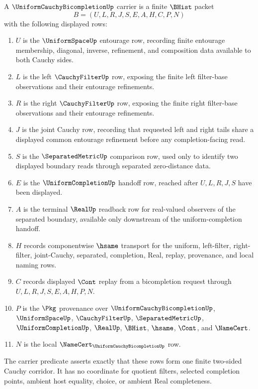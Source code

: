 \begin{definition}
\label{def:uniform-cauchy-bicompletion-carrier}
A $\UniformCauchyBicompletionUp$ carrier is a finite $\BHist$ packet
$$
B=(U,L,R,J,S,E,A,H,C,P,N)
$$
with the following displayed rows:
\begin{enumerate}
\item $U$ is the $\UniformSpaceUp$ entourage row, recording finite entourage membership, diagonal, inverse, refinement, and composition data available to both Cauchy sides.
\item $L$ is the left $\CauchyFilterUp$ row, exposing the finite left filter-base observations and their entourage refinements.
\item $R$ is the right $\CauchyFilterUp$ row, exposing the finite right filter-base observations and their entourage refinements.
\item $J$ is the joint Cauchy row, recording that requested left and right tails share a displayed common entourage refinement before any completion-facing read.
\item $S$ is the $\SeparatedMetricUp$ comparison row, used only to identify two displayed boundary reads through separated zero-distance data.
\item $E$ is the $\UniformCompletionUp$ handoff row, reached after $U,L,R,J,S$ have been displayed.
\item $A$ is the terminal $\RealUp$ readback row for real-valued observers of the separated boundary, available only downstream of the uniform-completion handoff.
\item $H$ records componentwise $\hsame$ transport for the uniform, left-filter, right-filter, joint-Cauchy, separated, completion, Real, replay, provenance, and local naming rows.
\item $C$ records displayed $\Cont$ replay from a bicompletion request through $U,L,R,J,S,E,A,H,P,N$.
\item $P$ is the $\Pkg$ provenance over $\UniformCauchyBicompletionUp$, $\UniformSpaceUp$, $\CauchyFilterUp$, $\SeparatedMetricUp$, $\UniformCompletionUp$, $\RealUp$, $\BHist$, $\hsame$, $\Cont$, and $\NameCert$.
\item $N$ is the local $\NameCert_{\UniformCauchyBicompletionUp}$ row.
\end{enumerate}
The carrier predicate asserts exactly that these rows form one finite two-sided Cauchy corridor. It has no coordinate for quotient filters, selected completion points, ambient host equality, choice, or ambient Real completeness.
\end{definition}

